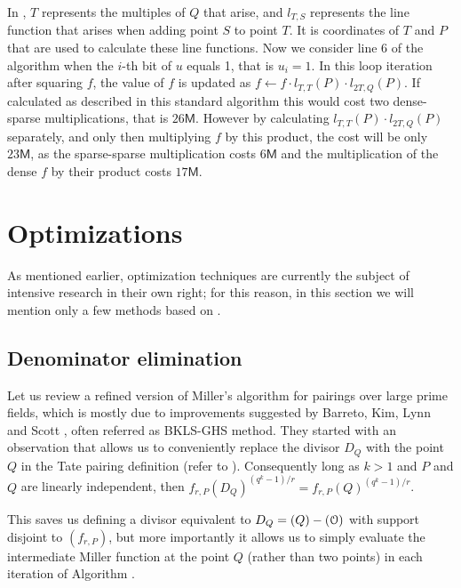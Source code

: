 In , $T$ represents the multiples of $Q$ that arise, and $l_{T,S}$
represents the line function that arises when adding point $S$ to point $T$. It is coordinates of $T$ and $P$ that are used to calculate these line functions. Now we consider line 6 of the algorithm when the $i$-th bit of $u$ equals 1, that is $u_i = 1$. In this loop iteration after squaring $f$, the value of $f$ is
updated as $f \leftarrow f \cdot l_{T,T}(P) \cdot l_{2T,Q}(P)$. If calculated
as described in this standard algorithm this would cost two dense-sparse
multiplications, that is $26\mathsf{M}$. However by calculating
$l_{T,T}(P) \cdot l_{2T,Q}(P)$ separately, and only then multiplying $f$ by
this product, the cost will be only $23\mathsf{M}$, as the sparse-sparse
multiplication costs $6\mathsf{M}$ and the multiplication of the dense $f$ by
their product costs $17\mathsf{M}$.


\section{Optimizations}
\label{ssec:optimizations}

As mentioned earlier, optimization techniques are currently the subject of intensive research in their own right; for this reason, in this section we will mention only a few methods based on \cite{theory.pairings.for.beginners}.


\subsection{Denominator elimination}
\label{ssec:denominatorelimination}

Let us review a refined version of Miller's algorithm for pairings over large prime fields, which is mostly due to improvements suggested by Barreto, Kim, Lynn and Scott \cite{BKLS02}, often referred as BKLS-GHS method.
They started with an observation that allows us to conveniently replace the divisor $D_Q$ with the point $Q$ in the Tate pairing definition (refer to ). Consequently long as $k > 1$ and $P$ and $Q$ are linearly independent, then $f_{r,P}(D_Q)^{(q^k-1)/r} = f_{r,P}(Q)^{(q^k-1)/r}$.

This saves us defining a divisor equivalent to $D_Q = (Q) - (\EuScript{O})$ with support disjoint to $(f_{r,P})$, but more importantly it allows us to simply evaluate the intermediate Miller function at the point $Q$ (rather than two points) in each iteration of Algorithm .

